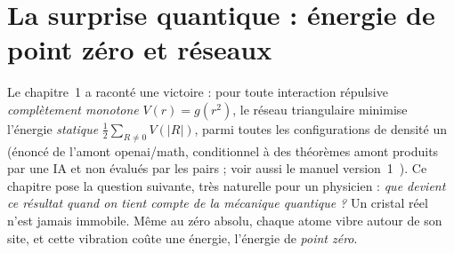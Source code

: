 
\chapter{La surprise quantique : énergie de point zéro et réseaux}\label{ch3:chap}\label{ch3:debut}

\noindent Le chapitre~1 a raconté une victoire : pour toute interaction répulsive \emph{complètement monotone}
$V(r)=g(r^2)$, le réseau triangulaire minimise l'énergie \emph{statique} $\tfrac12\sum_{R\neq0}V(|R|)$, parmi toutes les
configurations de densité un (énoncé de l'amont openai/math, \tierA{} conditionnel à des théorèmes amont produits par une
IA et non évalués par les pairs ; voir aussi le manuel version~1~\cite{v1}). Ce chapitre pose la question suivante, très naturelle pour un physicien : \emph{que
devient ce résultat quand on tient compte de la mécanique quantique ?} Un cristal réel n'est jamais immobile. Même au
zéro absolu, chaque atome vibre autour de son site, et cette vibration coûte une énergie, l'énergie de \emph{point zéro}.

